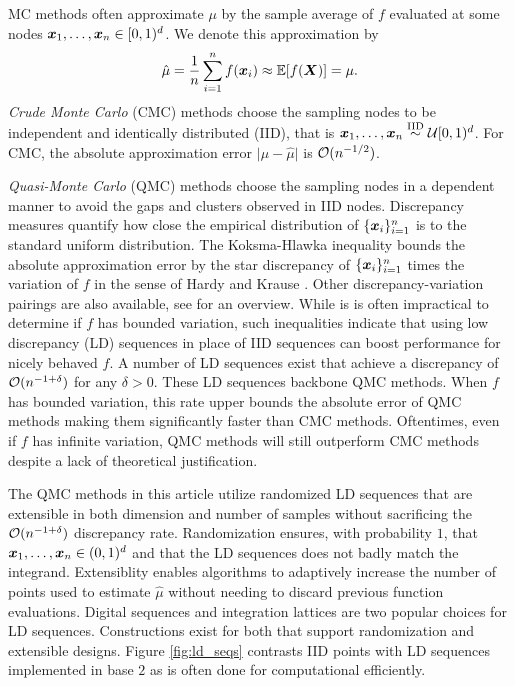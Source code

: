 \documentclass{article}[12pt]
\begin{document}
MC methods often approximate $\mu$ by the sample average of $f$ evaluated at some nodes $\boldsymbol{x}_1,\dots,\boldsymbol{x}_n \in [0,1)^d$. We denote this approximation by  
\begin{equation}
    \label{eq:mcapprox}
    \hat{\mu} = \frac{1}{n}\sum_{i=1}^n f(\boldsymbol{x}_i) \approx \mathbb{E}[f(\boldsymbol{X})] = \mu. 
\end{equation}
\emph{Crude Monte Carlo} (CMC) methods choose the sampling nodes to be independent and identically distributed (IID), that is $\boldsymbol{x}_1,\dots,\boldsymbol{x}_n \overset{\text{IID}}{\sim} \mathcal{U}[0,1)^{d}$. For CMC, the absolute approximation error $\lvert \mu - \hat{\mu} \rvert$ is $\mathcal{O}(n^{-1/2})$. 

\emph{Quasi-Monte Carlo} (QMC) methods choose the sampling nodes in a dependent manner to avoid the gaps and clusters observed in IID nodes. Discrepancy measures quantify how close the empirical distribution of $\{\boldsymbol{x}_i\}_{i=1}^n$ is to the standard uniform distribution. The Koksma-Hlawka inequality bounds the absolute approximation error by the star discrepancy of $\{\boldsymbol{x}_i\}_{i=1}^n$ times the variation of $f$ in the sense of Hardy and Krause \cite{dick2013high}. Other discrepancy-variation pairings are also available, see \cite{hickernell1998generalized} for an overview. While is is often impractical to determine if $f$ has bounded variation, such inequalities indicate that using low discrepancy (LD) sequences in place of IID sequences can boost performance for nicely behaved $f$. A number of LD sequences exist that achieve a discrepancy of $\mathcal{O}(n^{-1+\delta})$ for any $\delta > 0$. These LD sequences backbone QMC methods. When $f$ has bounded variation, this rate upper bounds the absolute error of QMC methods making them significantly faster than CMC methods. Oftentimes, even if $f$ has infinite variation, QMC methods will still outperform CMC methods despite a lack of theoretical justification. 


The QMC methods in this article utilize randomized LD sequences that are extensible in both dimension and number of samples without sacrificing the $\mathcal{O}(n^{-1+\delta})$ discrepancy rate. Randomization ensures, with probability $1$, that $\boldsymbol{x}_1,\dots,\boldsymbol{x}_n \in (0,1)^d$ and that the LD sequences does not badly match the integrand. Extensiblity enables algorithms to adaptively increase the number of points used to estimate $\hat{\mu}$ without needing to discard previous function evaluations. Digital sequences and integration lattices are two popular choices for LD sequences. Constructions exist for both that support randomization and extensible designs. Figure \ref{fig:ld_seqs} contrasts IID points with LD sequences implemented in base $2$ as is often done for computational efficiently.
\end{document}
